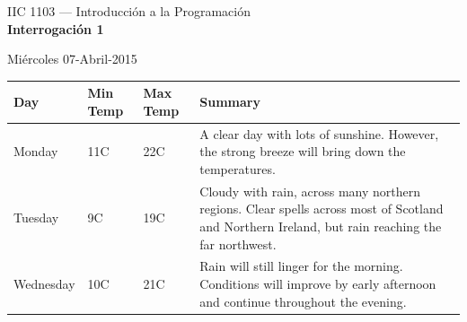 \documentclass{article}
\begin{document}
 \renewcommand{\theenumii}{\theenumi.\arabic{enumii}}
 \renewcommand{\thesubsection}{\arabic{subsection}}
 \renewcommand{\theenumiii}{\alph{enumiii}}


 \setlength{\parskip}{0pt}
 \setlength{\itemsep}{0pt}
 \setlength{\topsep}{0pt}
 \setlength{\partopsep}{0pt}
 \setlength{\itemsep}{0pt}

 \begin{center}
 \large IIC 1103 --- Introducción a la Programación \\
 \textbf{Interrogación 1} \\
 \end{center}


 \begin{flushright}
   Miércoles 07-Abril-2015
 \end{flushright}


 \begin{tabular}{ | l | l | l | p{5cm} |}
   \hline
   Day & Min Temp & Max Temp & Summary \\ \hline
   Monday & 11C & 22C & A clear day with lots of sunshine.  
   However, the strong breeze will bring down the temperatures. \\ \hline
   Tuesday & 9C & 19C & Cloudy with rain, across many northern regions. Clear spells 
   across most of Scotland and Northern Ireland, 
   but rain reaching the far northwest. \\ \hline
   Wednesday & 10C & 21C & Rain will still linger for the morning. 
   Conditions will improve by early afternoon and continue 
   throughout the evening. \\
   \hline
   \end{tabular}
   
   
   \begin{table}[h]  \end{table}
  
  
\end{document}
